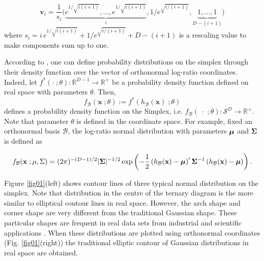 \documentclass[10pt, a4paper]{article}
\begin{document}
\[
\textbf{v}_i = \frac{1}{s_i}\Big( \underbrace{e^{1/\sqrt{i(i+1)}}, \dots, e^{1/\sqrt{i(i+1)}}}_{i}, 1/e^{\sqrt{ i/(i+1)}}, \underbrace{1, \dots, 1}_{D-(i+1)} \Big) 
\]
where $s_i =  i\,e^{1/\sqrt{i(i+1)}} + 1/e^{\sqrt{ i/(i+1)}} + D - (i+1)$ is a rescaling value to make components sum up to one.


According to \cite{mateu2013normal}, one can define probability distributions on the simplex through their density function over the vector of orthonormal log-ratio coordinates. Indeed, let $f^*(\cdot \;; \theta) : \mathbb{R}^{D-1} \rightarrow \mathbb{R}^+$ be a probability density function defined on real space with parameters $\theta$. Then, \[f_\mathcal{B}(\mathbf{x}\;; \theta) := f^*(h_\mathcal{B}(\textbf{x})\;; \theta)\] defines a probability density function on the Simplex, i.e. $f_\mathcal{B}(\;\cdot\;; \theta): \mathcal{S}^D \rightarrow \mathbb{R}^+$. Note that parameter $\theta$ is defined in the coordinate space. For example, fixed an orthonormal basis $\mathcal{B}$, the log-ratio normal distribution with parameters $\mbox{\boldmath \(\mu\)}$ and $\mathbf{\Sigma}$ is defined as

\begin{equation}\label{eq:densSNormal}
f_\mathcal{B}(\mathbf{x}\;; \mu, \Sigma) =(2\pi)^{-(D-1)/2} |\mathbf{\Sigma}|^{-1/2} \exp \left( -{\frac{1}{2}} \left(h_\mathcal{B}(\textbf{x})- \mbox{\boldmath \(\mu\)} \right)' \mathbf{\Sigma}^{-1} \left( h_\mathcal{B}(\textbf{x})- \mbox{\boldmath\(\mu\)} \right)\right).
\end{equation}

Figure \ref{fig01}(left) shows  contour lines of three typical normal distribution on the simplex. Note that distribution in the centre of the ternary diagram is the more similar to elliptical contour lines in real space. However, the arch shape and corner shape are very different from the traditional Gaussian shape. These particular shapes are frequent in real data sets from industrial and scientific applications \citep{aitchison1986statistical, Buccianti11}.
When these distributions are plotted using orthonormal coordinates (Fig. \ref{fig01}(right)) the traditional elliptic contour of
Gaussian distributions in real space are obtained.
\end{document}
